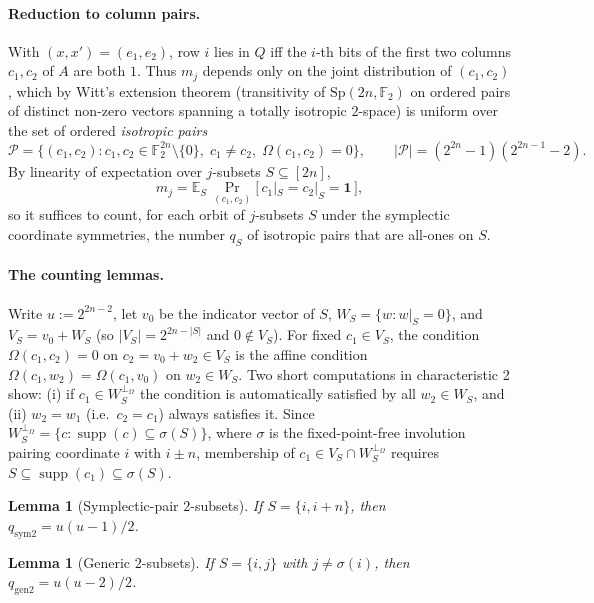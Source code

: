 \documentclass[11pt,a4paper]{article}
\theoremstyle{plain}
\newtheorem{lemma}[theorem]{Lemma}
\theoremstyle{definition}
\newcommand{\F}{\mathbb{F}}
\newcommand{\E}{\mathbb{E}}
\begin{document}
\paragraph{Reduction to column pairs.} With $(x,x')=(e_1,e_2)$, row $i$ lies in $Q$ iff the $i$-th bits of the first two columns $c_1, c_2$ of $A$ are both $1$. Thus $m_j$ depends only on the joint distribution of $(c_1, c_2)$, which by Witt's extension theorem (transitivity of $\mathrm{Sp}(2n,\F_2)$ on ordered pairs of distinct non-zero vectors spanning a totally isotropic $2$-space) is uniform over the set of ordered \emph{isotropic pairs}
\[
\mathcal{P} = \{(c_1,c_2) : c_1, c_2 \in \F_2^{2n}\setminus\{0\},\; c_1 \neq c_2,\; \Omega(c_1,c_2)=0\},
\qquad |\mathcal{P}| = (2^{2n}-1)(2^{2n-1}-2).
\]
By linearity of expectation over $j$-subsets $S \subseteq [2n]$,
\[
m_j = \E_{S}\,\Pr_{(c_1,c_2)}\bigl[\,c_1|_S = c_2|_S = \mathbf{1}\,\bigr],
\]
so it suffices to count, for each orbit of $j$-subsets $S$ under the symplectic coordinate symmetries, the number $q_S$ of isotropic pairs that are all-ones on $S$.

\paragraph{The counting lemmas.} Write $u := 2^{2n-2}$, let $v_0$ be the indicator vector of $S$, $W_S = \{w : w|_S = 0\}$, and $V_S = v_0 + W_S$ (so $|V_S| = 2^{2n-|S|}$ and $0 \notin V_S$). For fixed $c_1 \in V_S$, the condition $\Omega(c_1, c_2) = 0$ on $c_2 = v_0 + w_2 \in V_S$ is the affine condition $\Omega(c_1, w_2) = \Omega(c_1, v_0)$ on $w_2 \in W_S$. Two short computations in characteristic 2 show: (i) if $c_1 \in W_S^{\perp_\Omega}$ the condition is automatically satisfied by all $w_2 \in W_S$, and (ii) $w_2 = w_1$ (i.e.\ $c_2 = c_1$) always satisfies it. Since $W_S^{\perp_\Omega} = \{c : \operatorname{supp}(c) \subseteq \sigma(S)\}$, where $\sigma$ is the fixed-point-free involution pairing coordinate $i$ with $i \pm n$, membership of $c_1 \in V_S \cap W_S^{\perp_\Omega}$ requires $S \subseteq \operatorname{supp}(c_1) \subseteq \sigma(S)$.

\begin{lemma}[Symplectic-pair $2$-subsets]
\label{lem:sym2}
If $S = \{i, i+n\}$, then $q_{\mathrm{sym2}} = u(u-1)/2$.
\end{lemma}

\begin{lemma}[Generic $2$-subsets]
\label{lem:gen2}
If $S = \{i,j\}$ with $j \neq \sigma(i)$, then $q_{\mathrm{gen2}} = u(u-2)/2$.
\end{lemma}
\end{document}
